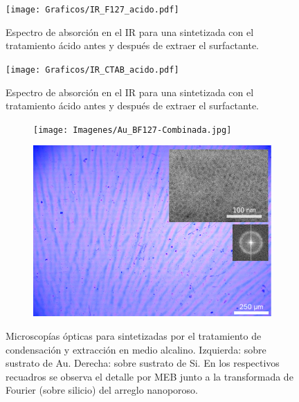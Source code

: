     		\begin{figure}
			\centering
			\texttt{[image: Graficos/IR\_F127\_acido.pdf]}
			\caption[FTIR \pdmF\space tratamiento ácido.]{Espectro de absorción en el IR para una \pdmF\space sintetizada con el tratamiento ácido antes y después de extraer el surfactante.}
			\label{fig:IR_F127_acido}
		    \end{figure}
    	

    		\begin{figure}
			\centering
			\texttt{[image: Graficos/IR\_CTAB\_acido.pdf]}
			\caption[FTIR \pdmC\space tratamiento ácido.]{Espectro de absorción en el IR para una \pdmC\space sintetizada con el tratamiento ácido antes y después de extraer el surfactante.}
			\label{fig:IR_CTAB_acido}
			\end{figure}
	
    	

    		\begin{figure}
 	   	    \begin{subfigure}{0.495\textwidth}
	       	\texttt{[image: Imagenes/Au\_BF127-Combinada.jpg]}
	   		\end{subfigure}
	   		\begin{subfigure}{0.495\textwidth}
	   	    \includegraphics[width=\textwidth]{Imagenes/Si_BF127-Combinada.jpg}
	   		\end{subfigure}
			 \caption[Microscopía óptica \pdmF tratamiento en medio alcalino.]{Microscopías ópticas para \pdmF\space sintetizadas por el tratamiento de condensación y extracción en medio alcalino. Izquierda: sobre sustrato de Au. Derecha: sobre sustrato de Si. En los respectivos recuadros se observa el detalle por MEB junto a la transformada de Fourier (sobre silicio) del arreglo nanoporoso.}
			 \label{fig:Microscopia_F127_basico}	
		     \end{figure}

